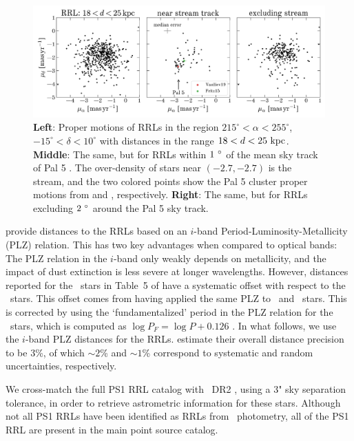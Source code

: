 \documentclass[twocolumn]{aastex63}
\begin{document}
\begin{figure}[th]
\begin{center}
\includegraphics[width=\textwidth]{proper-motion.pdf}
\caption{\textbf{Left}: Proper motions of RRLs in the region $215^\circ < \alpha < 255^\circ$, $-15^\circ < \delta < 10^\circ$ with distances in the range $18 < d < 25~\mathrm{kpc}$.
\textbf{Middle}: The same, but for RRLs within $1~\mbox{$^\circ$}$ of the mean sky track of Pal 5 \citep{Bonaca:2019}.
The over-density of stars near $(-2.7, -2.7)$ is the stream, and the two colored points show the Pal 5 cluster proper motions from \citet{Vasiliev:2019} and \citet{Fritz:2015}, respectively.
\textbf{Right}: The same, but for RRLs excluding $2~\mbox{$^\circ$}$ around the Pal 5 sky track.}
\label{fig:pm}
\end{center}
\end{figure}

\citet{Sesar:2017b} provide distances to the RRLs based on an $i$-band Period-Luminosity-Metallicity (PLZ) relation.
This has two key advantages when compared to optical bands: The PLZ relation in the $i$-band only weakly depends on metallicity, and the impact of dust extinction is less severe at longer wavelengths.
However, distances reported for the \rrc~stars in Table~5 of \citet{Sesar:2017b} have a systematic offset with respect to the \typeab~stars.
This offset comes from having applied the same PLZ to \typeab~and \typec~stars.
This is corrected by using the `fundamentalized' period in the PLZ relation for the \rrc~stars, which is computed as $\log{P_F} = \log P + 0.126$ \citep[following][]{Braga2016}.
In what follows, we use the $i$-band PLZ distances for the RRLs.
\citet{Sesar:2017b} estimate their overall distance precision to be 3\%, of which $\sim2$\% and $\sim1$\% correspond to systematic and random uncertainties, respectively.

We cross-match the full PS1 RRL catalog with \Gaia~DR2 \citep{Gaia:2018}, using a 3" sky separation tolerance, in order to retrieve astrometric information for these stars.
Although not all PS1 RRLs have been identified as RRLs from \Gaia\ photometry, all of the PS1 RRL are present in the main point source catalog.
\end{document}
